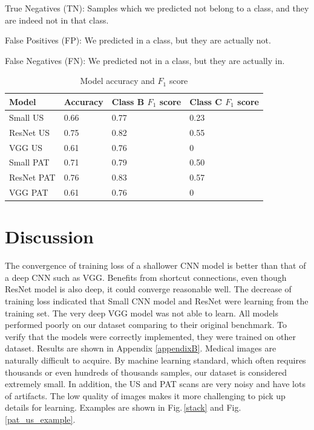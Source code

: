 \noindent True Negatives (TN): Samples which we predicted not belong to a class, and they are indeed not in that class.

\noindent False Positives (FP): We predicted in a class, but they are actually not.

\noindent False Negatives (FN): We predicted not in a class, but they are actually in.

\begin{table}[h]
\centering
\begin{tabular}{ |p{3cm}||p{3cm}|p{3cm}|p{3cm}|  }
 \hline
 Model       & Accuracy & Class B $F_1$ score & Class C $F_1$ score\\
 \hline
 Small  US   & 0.66  & 0.77 &  0.23\\
 ResNet US   & 0.75  & 0.82 &  0.55\\
 VGG US      & 0.61  & 0.76 &  0\\
 Small PAT   & 0.71  & 0.79 &  0.50\\
 ResNet PAT  & 0.76  & 0.83 &  0.57\\
 VGG PAT     & 0.61  & 0.76 &  0\\
 \hline
\end{tabular}
\caption{Model accuracy and $F_1$ score}
\label{acctable}
\end{table}

\section{Discussion}
The convergence of training loss of a shallower CNN model is better than that of a deep CNN such as VGG. Benefits from shortcut connections, even though ResNet model is also deep, it could converge reasonable well. The decrease of training loss indicated that Small CNN model and ResNet were learning from the training set. The very deep VGG model was not able to learn. All models performed poorly on our dataset comparing to their original benchmark. To verify that the models were correctly implemented, they were trained on other dataset. Results are shown in Appendix \ref{appendixB}. Medical images are naturally difficult to acquire. By machine learning standard, which often requires thousands or even hundreds of thousands samples, our dataset is considered extremely small. In addition, the US and PAT scans are very noisy and have lots of artifacts. The low quality of images makes it more challenging to pick up details for learning. Examples are shown in Fig.\,\ref{stack} and Fig.\,\ref{pat_us_example}.

